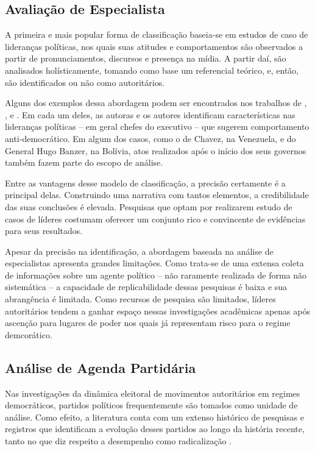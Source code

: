 \documentclass[
12pt,				%
openright,			%
twoside,			%
a4paper,			%
english,			%
french,				%
spanish,			%
brazil				%
]{abntex2}
\begin{document}
\subsection{Avaliação de Especialista}

A primeira e mais popular forma de classificação baseia-se em estudos de caso de lideranças políticas, nos quais suas atitudes e comportamentos são observados a partir de pronunciamentos, discursos e presença na mídia. A partir daí, são analisados holísticamente, tomando como base um referencial teórico, e, então, são identificados ou não como autoritários.

Alguns dos exemplos dessa abordagem podem ser encontrados nos trabalhos de , ,  e . Em cada um deles, as autoras e os autores identificam características nas lideranças políticas -- em geral chefes do executivo -- que sugerem comportamento anti-democrático. Em algum dos casos, como o de Chavez, na Venezuela, e do General Hugo Banzer, na Bolívia, atos realizados após o início dos seus governos também fazem parte do escopo de análise.

Entre as vantagens desse modelo de classificação, a precisão certamente é a principal delas. Construindo uma narrativa com tantos elementos, a credibilidade das suas conclusões é elevada. Pesquisas que optam por realizarem estudo de casos de líderes costumam oferecer um conjunto rico e convincente de evidências para seus resultados.

Apesar da precisão na identificação, a abordagem baseada na análise de especialistas apresenta grandes limitações. Como trata-se de uma extensa coleta de informações sobre um agente político -- não raramente realizada de forma não sistemática -- a capacidade de replicabilidade dessas pesquisas é baixa e sua abrangência é limitada. Como recursos de pesquisa são limitados, líderes autoritários tendem a ganhar espaço nessas investigações acadêmicas apenas após ascenção para lugares de poder nos quais já representam risco para o regime demcorático.

\subsection{Análise de Agenda Partidária}

Nas investigações da dinâmica eleitoral de movimentos autoritários em regimes democráticos, partidos políticos frequentemente são tomados como unidade de análise. Como efeito, a literatura conta com um extenso histórico de pesquisas e registros que identificam a evolução desses partidos ao longo da história recente, tanto no que diz respeito a desempenho como radicalização \cite{norris2005radical, mudde2009populist, caiani2017radical, mudde2016introduction, mudde2017ideational}. 
\end{document}
